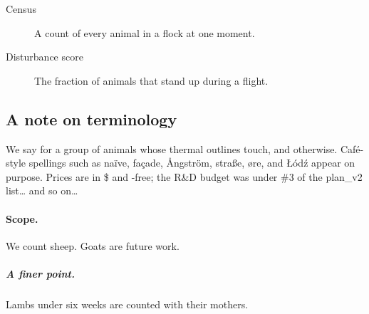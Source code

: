 \begin{description}
  \item[Census] A count of every animal in a flock at one moment.
  \item[Disturbance score] The fraction of animals that stand up during a flight.
\end{description}

\subsection{A note on terminology}
We say  for a group of animals whose thermal outlines touch, and  otherwise. Caf\'e-style spellings such as na\"ive, fa\c{c}ade, \AA{}ngstr\"om, stra{\ss}e, {\o}re, and \L{}\'od\'z appear on purpose. Prices are in \$ and \texteuro{}-free; the R\&D budget was under \#3 of the plan\_v2 list\ldots{} and so on\dots

\paragraph{Scope.} We count sheep. Goats are future work.
\subparagraph{A finer point.} Lambs under six weeks are counted with their mothers.
